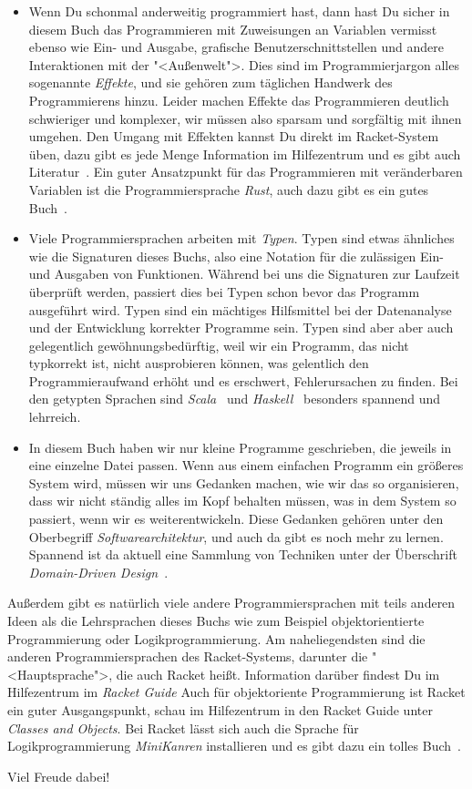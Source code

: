 \begin{itemize}
\item Wenn Du schonmal anderweitig programmiert hast, dann hast Du
  sicher in diesem Buch das Programmieren mit Zuweisungen an Variablen
  vermisst ebenso wie Ein- und Ausgabe, grafische
  Benutzerschnittstellen und andere Interaktionen mit der
  "<Außenwelt">.  Dies sind im Programmierjargon alles sogenannte
  \textit{Effekte}, und sie gehören zum täglichen
  Handwerk des Programmierens hinzu.  Leider machen Effekte das
  Programmieren deutlich schwieriger und komplexer, wir müssen also
  sparsam und sorgfältig mit ihnen umgehen. Den Umgang mit Effekten
  kannst Du direkt im Racket-System üben, dazu gibt es jede Menge
  Information im Hilfezentrum und es gibt auch
  Literatur~\cite{FelleisenEtAll2013}.  Ein guter Ansatzpunkt für das
  Programmieren mit veränderbaren Variablen ist die Programmiersprache
  \textit{Rust}, auch dazu gibt es ein gutes
  Buch~\cite{KlabnikNichols2018}.
\item Viele Programmiersprachen arbeiten mit
  \textit{Typen}.  Typen sind etwas ähnliches wie die
  Signaturen dieses Buchs, also eine Notation für die zulässigen Ein-
  und Ausgaben von Funktionen.  Während bei uns die Signaturen zur
  Laufzeit überprüft werden, passiert dies bei Typen schon bevor das
  Programm ausgeführt wird.  Typen sind ein mächtiges Hilfsmittel bei
  der Datenanalyse und der Entwicklung korrekter Programme sein.
  Typen sind aber aber auch gelegentlich gewöhnungsbedürftig, weil wir
  ein Programm, das nicht typkorrekt ist, nicht ausprobieren können,
  was gelentlich den Programmieraufwand erhöht und es erschwert,
  Fehlerursachen zu finden.  Bei den getypten Sprachen sind
  \textit{Scala}~\cite{ChiusanoBjarnason2014} und
  \textit{Haskell}~\cite{Hutton2016} besonders spannend und
  lehrreich.
\item In diesem Buch haben wir nur kleine Programme geschrieben, die
  jeweils in eine einzelne Datei passen.  Wenn aus einem einfachen
  Programm ein größeres System wird, müssen wir uns Gedanken machen,
  wie wir das so organisieren, dass wir nicht ständig alles im Kopf
  behalten müssen, was in dem System so passiert, wenn wir es
  weiterentwickeln.  Diese Gedanken gehören unter den Oberbegriff
  \textit{Softwarearchitektur}, und auch da
  gibt es noch mehr zu lernen.  Spannend ist da aktuell eine Sammlung
  von Techniken unter der Überschrift \textit{Domain-Driven
    Design}~\cite{Evans2004}.
\end{itemize}
%
Außerdem gibt es natürlich viele andere Programmiersprachen mit teils
anderen Ideen als die Lehrsprachen dieses Buchs wie zum Beispiel
objektorientierte Programmierung oder Logikprogrammierung.  Am
naheliegendsten sind die anderen Programmiersprachen des
Racket-Systems, darunter die "<Hauptsprache">, die auch Racket heißt.
Information darüber findest Du im Hilfezentrum im \textit{Racket
  Guide} Auch für objektoriente Programmierung ist Racket ein guter
Ausgangspunkt, schau im Hilfezentrum in den Racket Guide unter
\textit{Classes and Objects}.  Bei Racket lässt sich auch die Sprache
für Logikprogrammierung \textit{MiniKanren} installieren und es gibt
dazu ein tolles Buch~\cite{FriedmanEtAl2018}.

Viel Freude dabei!

